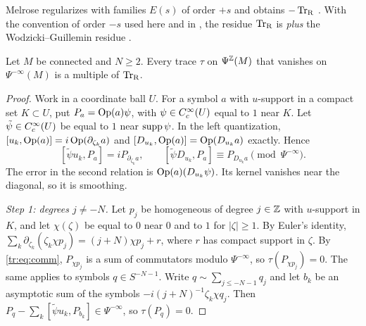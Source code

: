 \begin{remark}\label{tr:rem:sign}
Melrose regularizes with families \(E(s)\) of order \(+s\) and obtains
\(-\operatorname{Tr}_{\mathrm R}\) \cite[Ch.~15]{MelroseMicro}. With the convention of order \(-s\)
used here and in \cite{MN}, the residue \(\operatorname{Tr}_{\mathrm R}\) is \emph{plus} the
Wodzicki--Guillemin residue \cite{Wodzicki-residue,Guillemin-residue}.
\end{remark}

\begin{proposition}[Uniqueness]\label{tr:prop:unique}
Let \(M\) be connected and \(N\ge2\). Every trace \(\tau\) on
\(\Psi^{\mathbb Z}(M)\) that vanishes on \(\Psi^{-\infty}(M)\) is a multiple of
\(\operatorname{Tr}_{\mathrm R}\).
\end{proposition}

\begin{proof}
Work in a coordinate ball \(U\). For a symbol \(a\) with \(u\)-support in a
compact set \(K\subset U\), put \(P_a=\operatorname{Op}(a)\psi\), with \(\psi\in
C^\infty_c(U)\) equal to \(1\) near \(K\). Let \(\tilde\psi\in C^\infty_c(U)\) be equal
to \(1\) near \(\operatorname{supp}\psi\). In the left quantization, \([u_k,\operatorname{Op}(a)]=
i\operatorname{Op}(\partial_{\zeta_k}a)\) and \([D_{u_k},\operatorname{Op}(a)]=\operatorname{Op}(D_{u_k}a)\)
exactly. Hence
\begin{equation}\label{tr:eq:comm}
 [\tilde\psi u_k,P_a]=iP_{\partial_{\zeta_k}a},\qquad
 [\tilde\psi D_{u_k},P_a]\equiv P_{D_{u_k}a}\pmod{\Psi^{-\infty}} .
\end{equation}
The error in the second relation is \(\operatorname{Op}(a)(D_{u_k}\psi)\). Its kernel
vanishes near the diagonal, so it is smoothing.

\emph{Step 1: degrees \(j\ne-N\).} Let \(p_j\) be homogeneous of degree
\(j\in\mathbb Z\) with \(u\)-support in \(K\), and let \(\chi(\zeta)\) be equal to
\(0\) near \(0\) and to \(1\) for \(|\zeta|\ge1\). By Euler's identity,
\(\sum_k\partial_{\zeta_k}(\zeta_k\chi p_j)=(j+N)\chi p_j+r\), where \(r\)
has compact support in \(\zeta\). By \eqref{tr:eq:comm}, \(P_{\chi p_j}\) is
a sum of commutators modulo \(\Psi^{-\infty}\), so \(\tau(P_{\chi p_j})=0\).
The same applies to symbols \(q\in S^{-N-1}\). Write \(q\sim\sum_{j\le-N-1}
q_j\) and let \(b_k\) be an asymptotic sum of the symbols
\(-i(j+N)^{-1}\zeta_k\chi q_j\). Then \(P_q-\sum_k[\tilde\psi u_k,P_{b_k}]\in
\Psi^{-\infty}\), so \(\tau(P_q)=0\).


\end{proof}
